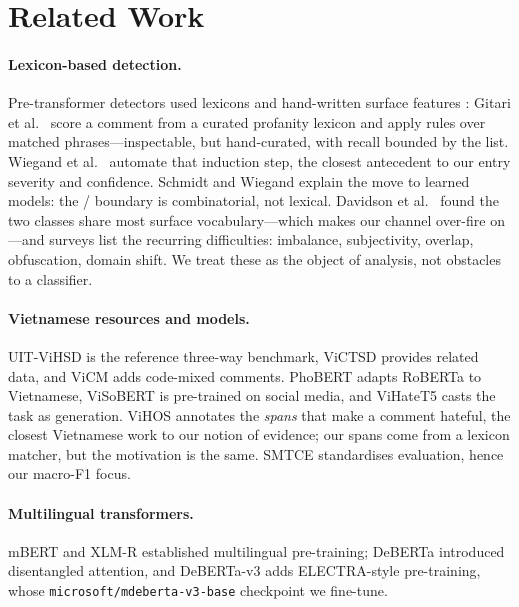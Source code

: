 \section{Related Work}
\label{sec:related}

\paragraph{Lexicon-based detection.}
Pre-transformer detectors used lexicons and hand-written surface features
\cite{waseem2016hateful}: Gitari et al.\ \cite{gitari2015lexicon} score a comment from a
curated profanity lexicon and apply rules over matched phrases---inspectable, but
hand-curated, with recall bounded by the list. Wiegand et al.\
\cite{wiegand2018inducing} automate that induction step, the closest antecedent to our
entry severity and confidence. Schmidt and Wiegand \cite{schmidt2017survey} explain the
move to learned models: the \hate{}/\off{} boundary is combinatorial, not lexical.
Davidson et al.\ \cite{davidson2017automated} found the two classes share most surface
vocabulary---which makes our channel over-fire on \off{}---and surveys
\cite{fortuna2018survey} list the recurring difficulties: imbalance, subjectivity,
overlap, obfuscation, domain shift. We treat these as the object of analysis, not
obstacles to a classifier.

\paragraph{Vietnamese resources and models.}
UIT-ViHSD \cite{luu2021vihsd} is the reference three-way benchmark, ViCTSD
\cite{nguyen2021victsd} provides related data, and ViCM \cite{nguyen2026vicm} adds
code-mixed comments. PhoBERT \cite{nguyen2020phobert} adapts RoBERTa to Vietnamese,
ViSoBERT \cite{nguyen2023visobert} is pre-trained on social media, and ViHateT5
\cite{nguyen2024vihatet5} casts the task as generation. ViHOS \cite{hoang2023vihos}
annotates the \emph{spans} that make a comment hateful, the closest Vietnamese work to
our notion of evidence; our spans come from a lexicon matcher, but the motivation is
the same. SMTCE \cite{nguyen2022smtce} standardises evaluation, hence our macro-F1
focus.


\paragraph{Multilingual transformers.}
mBERT \cite{devlin2019bert} and XLM-R \cite{conneau2020xlmr} established multilingual
pre-training; DeBERTa \cite{he2021deberta} introduced disentangled attention, and
DeBERTa-v3 \cite{he2023debertav3} adds ELECTRA-style pre-training, whose
\texttt{microsoft/\allowbreak mdeberta-v3-base} checkpoint \cite{liu2024mdeberta} we
fine-tune.

